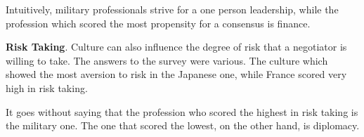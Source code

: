\documentclass[../main.tex]{subfiles}
\begin{document}
Intuitively, military professionals strive for a one person leadership, while the profession which scored the most propensity for a consensus is finance.

\vspace{0.3cm}
\begin{minipage}{\linewidth}
    \label{teamOrganisationPerProfession}
\end{minipage}
\vspace{0.3cm}

\textbf{Risk Taking}. Culture can also influence the degree of risk that a negotiator is willing to take. The answers to the survey were various. The culture which showed the most aversion to risk in the Japanese one, while France scored very high in risk taking.

\vspace{0.3cm}
\begin{minipage}{\linewidth}
    \label{riskTakingPerCountry}
\end{minipage}
\vspace{0.3cm}

It goes without saying that the profession who scored the highest in risk taking is the military one. The one that scored the lowest, on the other hand, is diplomacy.


\vspace{0.3cm}
\begin{minipage}{\linewidth}
    \label{riskTakingPerProfession}
\end{minipage}
\vspace{0.3cm}
\end{document}
